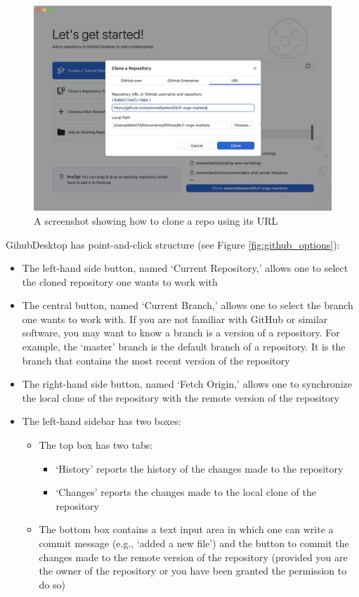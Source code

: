 \documentclass[a4paper,11pt]{book}
\begin{document}
\begin{appendices}
\begin{figure}[!htbp]
	\includegraphics[width=1\textwidth]{clone_with_url}
	\caption{A screenshot showing how to clone a repo using its URL}
	\label{fig:clone_with_url}
\end{figure}

\quad GihubDesktop has point-and-click structure (see Figure \ref{fig:github_options}):

\begin{itemize}
	\item The left-hand side button, named `Current Repository,' allows one to select the cloned repository one wants to work with 
	\item The central button, named `Current Branch,' allows one to select the branch one wants to work with. If you are not familiar with GitHub or similar software, you may want to know a branch is a version of a repository. For example, the `master' branch is the default branch of a repository. It is the branch that contains the most recent version of the repository
	\item The right-hand side button, named `Fetch Origin,' allows one to synchronize the local clone of the repository with the remote version of the repository
	\item The left-hand sidebar has two boxes:
	\begin{itemize}
		\item The top box has two tabs:
		\begin{itemize}
			\item `History' reports the history of the changes made to the repository
			\item `Changes' reports the changes made to the local clone of the repository
		\end{itemize}
		\item The bottom box contains a text input area in which one can write a commit message (e.g., `added a new file') and the button to commit the changes made to the remote version of the repository (provided you are the owner of the repository or you have been granted the permission to do so)
	\end{itemize}
\end{itemize}


\end{appendices}
\end{document}
